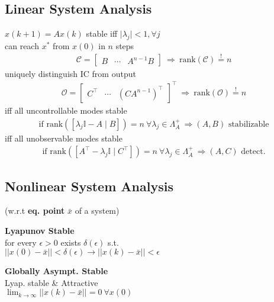 \subsection{Linear System Analysis}
 $x(k+1) = Ax(k)$ stable iff $\lvert \lambda_j \rvert < 1, \forall j$ \\
 can reach $x^*$ from $x(0)$ in $n$ steps
\begin{align*}
    \mathcal{C} =
    \begin{bmatrix}
        B & \cdots & A^{n-1} B
    \end{bmatrix}
    \ \Rightarrow \ \mathrm{rank}(\mathcal{C}) \overset{!}{=} n
\end{align*}
 uniquely distinguish IC from output
\begin{align*}
    \mathcal{O} =
    \begin{bmatrix}
        C^\top & \cdots & (CA^{n-1})^\top
    \end{bmatrix}^\top
    \ \Rightarrow \ \mathrm{rank}(\mathcal{O}) \overset{!}{=} n
\end{align*}
 iff all uncontrollable modes stable
\begin{align*}
    \textrm{if } \mathrm{rank}([\lambda_j \mathbb{I}-A \mid B]) = n \ \forall \lambda_j \in \Lambda_A^+ \ \Rightarrow (A,B) \textrm{ stabilizable}
\end{align*}
 iff all unobservable modes stable
\begin{align*}
    \textrm{if } \mathrm{rank}([A^\top - \lambda_j \mathbb{I} \mid C^\top]) = n \ \forall \lambda_j \in \Lambda_A^+ \ \Rightarrow (A,C) \textrm{ detect.}
\end{align*}


\subsection{Nonlinear System Analysis}
 (w.r.t \textbf{eq. point} $\bar{x}$ of a system)



\textbf{Lyapunov Stable} \\
for every $\epsilon>0$ exists $\delta(\epsilon)$ s.t.\\
$\lvert\lvert x(0) - \bar{x} \rvert\rvert < \delta(\epsilon) \to
    \lvert\lvert x(k) - \bar{x} \rvert\rvert < \epsilon$


\textbf{Globally Asympt. Stable}\\
Lyap. stable \& Attractive \\
$\lim_{k\to\infty} \lvert\lvert x(k) - \bar{x} \rvert\rvert = 0 \ \forall x(0)$



